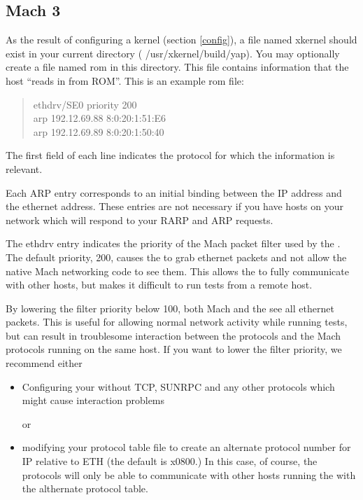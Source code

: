 \subsection{Mach 3}

As the result of configuring a kernel (section \ref{config}), a file
named {\sanss xkernel} should exist in your current directory ({\sanss
/usr/xkernel/build/yap}).  You may optionally create a file named
{\sanss rom} in this directory.  This file contains information that
the host ``reads in from ROM''.  This is an example {\sanss rom} file:

\begin{quote}
\begin{tt}
ethdrv/SE0      priority 200\\
arp		192.12.69.88  8:0:20:1:51:E6\\
arp		192.12.69.89  8:0:20:1:50:40\\
\end{tt}
\end{quote}

The first field of each line indicates the protocol for which the
information is relevant.

Each ARP entry corresponds to an initial binding between the IP
address and the ethernet address.  These entries 
are not necessary if you have hosts on your network which will
respond to your RARP and ARP requests.

The ethdrv entry indicates the priority of the Mach packet filter used by
the \xk{}.  The default priority, 200, causes
the \xk{} to grab ethernet packets and not allow
the native Mach networking code to see them.  This allows the \xk{} to
fully communicate with other hosts, but makes it difficult to run
\xk{} tests from a remote host.  

By lowering the filter priority below 100, both Mach and the \xk{} see
all ethernet packets.  This is useful for allowing normal network
activity while running \xk{} tests, but can result in troublesome
interaction between the \xk{} protocols and the Mach protocols running
on the same host.  If you want to lower the filter priority, we
recommend either

\begin{itemize}

\item
Configuring your \xk{} without TCP, SUNRPC and any other protocols which
might cause interaction problems

or

\item
modifying your protocol table file to create an alternate protocol
number for IP relative to ETH (the default is x0800.)  In this case,
of course, the \xk{} protocols will only be able to communicate with 
other hosts running the \xk{} with the althernate protocol table.

\end{itemize}

